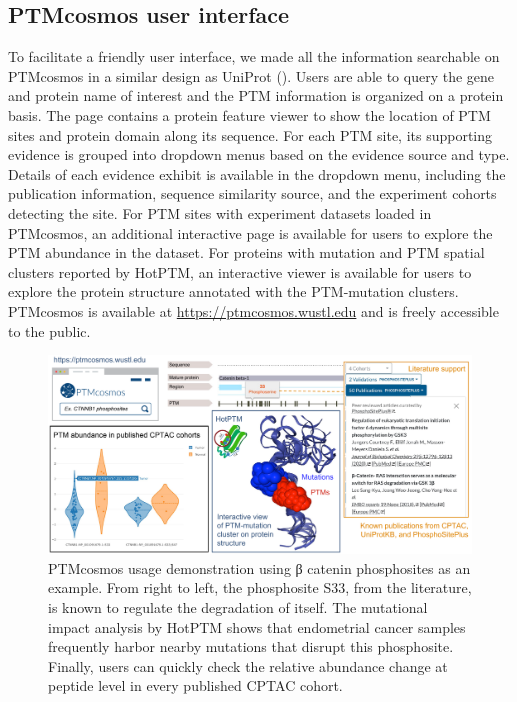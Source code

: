 \subsection{PTMcosmos user interface}
To facilitate a friendly user interface, we made all the information searchable on PTMcosmos in a similar design as UniProt (). Users are able to query the gene and protein name of interest and the PTM information is organized on a protein basis. The page contains a protein feature viewer to show the location of PTM sites and protein domain along its sequence. For each PTM site, its supporting evidence is grouped into dropdown menus based on the evidence source and type. Details of each evidence exhibit is available in the dropdown menu, including the publication information, sequence similarity source, and the experiment cohorts detecting the site. For PTM sites with experiment datasets loaded in PTMcosmos, an additional interactive page is available for users to explore the PTM abundance in the dataset. For proteins with mutation and PTM spatial clusters reported by HotPTM, an interactive viewer is available for users to explore the protein structure annotated with the PTM-mutation clusters. PTMcosmos is available at \url{https://ptmcosmos.wustl.edu} and is freely accessible to the public.

\begin{figure}[tb]
    \centering
    \includegraphics[width=\linewidth]{figures/chap03_ptmcosmos/figure3_ptmcosmos_usage.pdf}
    \caption[PTMcosmos usage demonstration.]{%
        PTMcosmos usage demonstration using β catenin phosphosites as an example. From right to left, the phosphosite S33, from the literature, is known to regulate the degradation of itself. The mutational impact analysis by HotPTM shows that endometrial cancer samples frequently harbor nearby mutations that disrupt this phosphosite. Finally, users can quickly check the relative abundance change at peptide level in every published CPTAC cohort.
    }
    \label{fig:ptmcosmos-usage-demo}
\end{figure}


